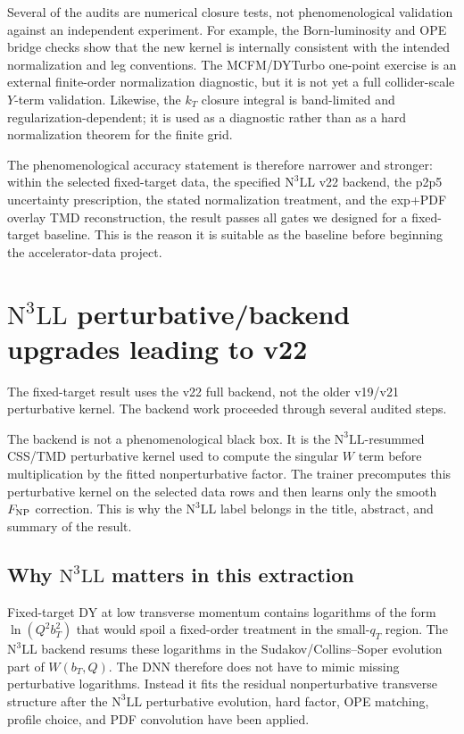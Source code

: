 \documentclass[11pt]{article}
\newcommand{\bt}{b_T}
\newcommand{\kt}{k_T}
\newcommand{\qT}{q_T}
\newcommand{\FNP}{F_{\rm NP}}
\newcommand{\NthreeLL}{\mathrm{N^{3}LL}}
\begin{document}
Several of the audits are numerical closure tests, not phenomenological validation against an independent experiment.  For example, the Born-luminosity and OPE bridge checks show that the new kernel is internally consistent with the intended normalization and leg conventions.  The MCFM/DYTurbo one-point exercise is an external finite-order normalization diagnostic, but it is not yet a full collider-scale $Y$-term validation.  Likewise, the $\kt$ closure integral is band-limited and regularization-dependent; it is used as a diagnostic rather than as a hard normalization theorem for the finite grid.

The phenomenological accuracy statement is therefore narrower and stronger: within the selected fixed-target data, the specified $\NthreeLL$ v22 backend, the p2p5 uncertainty prescription, the stated normalization treatment, and the exp+PDF overlay TMD reconstruction, the result passes all gates we designed for a fixed-target baseline.  This is the reason it is suitable as the baseline before beginning the accelerator-data project.

\section{$\NthreeLL$ perturbative/backend upgrades leading to v22}
\label{sec:backend}

The fixed-target result uses the v22 full backend, not the older v19/v21 perturbative kernel.  The backend work proceeded through several audited steps.


The backend is not a phenomenological black box.  It is the $\NthreeLL$-resummed CSS/TMD perturbative kernel used to compute the singular $W$ term before multiplication by the fitted nonperturbative factor.  The trainer precomputes this perturbative kernel on the selected data rows and then learns only the smooth $\FNP$ correction.  This is why the $\NthreeLL$ label belongs in the title, abstract, and summary of the result.

\subsection{Why $\NthreeLL$ matters in this extraction}

Fixed-target DY at low transverse momentum contains logarithms of the form $\ln(Q^2\bt^2)$ that would spoil a fixed-order treatment in the small-$\qT$ region.  The $\NthreeLL$ backend resums these logarithms in the Sudakov/Collins--Soper evolution part of $W(\bt,Q)$.  The DNN therefore does not have to mimic missing perturbative logarithms.  Instead it fits the residual nonperturbative transverse structure after the $\NthreeLL$ perturbative evolution, hard factor, OPE matching, profile choice, and PDF convolution have been applied.
\end{document}
